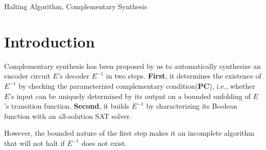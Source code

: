 \documentclass[journal]{IEEEtran}
\begin{document}
\begin{IEEEkeywords}
Halting Algorithm, Complementary Synthesis
\end{IEEEkeywords}


\newtheorem{definition11}{\textbf{Definition}}
\newtheorem{lemma}{\textbf{Lemma}}
\newtheorem{theorem}{\textbf{Theorem}}
\newtheorem{proposition}{\textbf{Proposition}}




%
\IEEEpeerreviewmaketitle



\section{Introduction}\label{sec_intro}
Complementary synthesis has been proposed by us \cite{ShengYuShen:iccad09} to automatically synthesize an encoder circuit $E$'s decoder $E^{-1}$ in two steps.
\textbf{First},
it determines the existence of $E^{-1}$ by checking the parameterized complementary condition($\boldsymbol{PC}$),
i.e.,
whether $E$'s input can be uniquely determined by its output on a bounded unfolding of $E$'s transition function.
\textbf{Second},
it builds $E^{-1}$ by characterizing its Boolean function with an all-solution SAT solver.

However,
the bounded nature of the first step makes it an incomplete algorithm
that will not halt if $E^{-1}$ does not exist.
\end{document}
